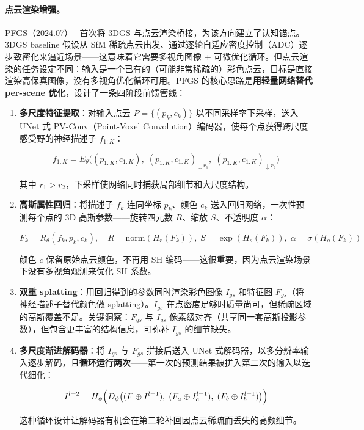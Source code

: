 \paragraph{点云渲染增强。}

PFGS（2024.07）~\cite{2407_03857} 首次将 3DGS 与点云渲染桥接，为该方向建立了认知锚点。3DGS baseline 假设从 SfM 稀疏点云出发、通过逐轮自适应密度控制（ADC）逐步致密化来逼近场景——这意味着它需要多视角图像 + 可微优化循环。但点云渲染的任务设定不同：输入是一个已有的（可能非常稀疏的）彩色点云，目标是直接渲染高保真图像，没有多视角优化循环可用。PFGS 的核心思路是\textbf{用轻量网络替代 per-scene 优化}，设计了一条四阶段前馈管线：

\begin{enumerate}
\item \textbf{多尺度特征提取}：对输入点云 $P = \{(p_k, c_k)\}$ 以不同采样率下采样，送入 UNet 式 PV-Conv（Point-Voxel Convolution）编码器，使每个点获得跨尺度感受野的神经描述子 $f_{1:K}$：

\begin{equation}
f_{1:K} = E_\theta\bigl((p_{1:K}, c_{1:K}),\; (p_{1:K}, c_{1:K})_{\downarrow r_1},\; (p_{1:K}, c_{1:K})_{\downarrow r_2}\bigr)
\end{equation}

其中 $r_1 > r_2$，下采样使网络同时捕获局部细节和大尺度结构。

\item \textbf{高斯属性回归}：将描述子 $f_k$ 连同坐标 $p_k$、颜色 $c_k$ 送入回归网络，一次性预测每个点的 3D 高斯参数——旋转四元数 $R$、缩放 $S$、不透明度 $\alpha$：

\begin{equation}
F_k = R_\theta(f_k, p_k, c_k), \quad R = \mathrm{norm}(H_r(F_k)),\; S = \exp(H_s(F_k)),\; \alpha = \sigma(H_o(F_k))
\end{equation}

颜色 $c$ 保留原始点云颜色，不再用 SH 编码——这很重要，因为点云渲染场景下没有多视角观测来优化 SH 系数。

\item \textbf{双重 splatting}：用回归得到的参数同时渲染彩色图像 $I_{gs}$ 和特征图 $F_{gs}$（将神经描述子替代颜色做 splatting）。$I_{gs}$ 在点密度足够时质量尚可，但稀疏区域的高斯覆盖不足。关键洞察：$F_{gs}$ 与 $I_{gs}$ 像素级对齐（共享同一套高斯投影参数），但包含更丰富的结构信息，可弥补 $I_{gs}$ 的细节缺失。

\item \textbf{多尺度渐进解码器}：将 $I_{gs}$ 与 $F_{gs}$ 拼接后送入 UNet 式解码器，以多分辨率输入逐步解码，且\textbf{循环运行两次}——第一次的预测结果被拼入第二次的输入以迭代细化：

\begin{equation}
I^{l=2} = H_\phi\Bigl(D_\phi\bigl((F \oplus I^{l=1}),\; (F_a \oplus I^{l=1}_a),\; (F_b \oplus I^{l=1}_b)\bigr)\Bigr)
\end{equation}

这种循环设计让解码器有机会在第二轮补回因点云稀疏而丢失的高频细节。
\end{enumerate}

